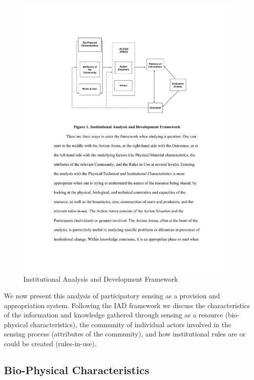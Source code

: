 \begin{figure}
\caption[Institutional Analysis and Development Framework]{Institutional Analysis and Development Framework~\protect\cite[p.44]{Ostrom2007a}}\label{fig:iad}
\includegraphics[width=\linewidth]{gfx/IAD.pdf}
\end{figure}

We now present this analysis of participatory sensing as a provision and appropriation system. 
Following the \ac{IAD} framework we discuss the characteristics of the information and knowledge gathered through sensing as a resource (bio-physical characteristics), the community of individual actors involved in the sensing process (attributes of the community), and how institutional rules are or could be created (rules-in-use).

\subsection{Bio-Physical Characteristics}

